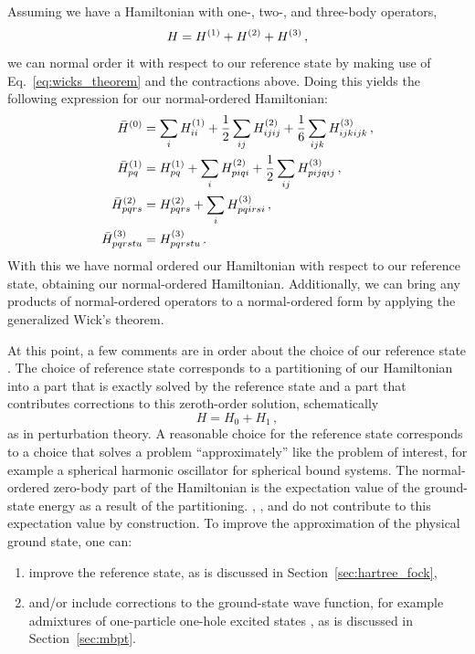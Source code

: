 Assuming we have a Hamiltonian with one-, two-, and three-body operators,
\begin{equation}\label{eq:standard_threebody_free_hamiltonian}
  H = {H}^{(1)} + {H}^{(2)} + {H}^{(3)}\,,
\end{equation}
we can normal order it with respect to our reference state
by making use of Eq.~\ref{eq:wicks_theorem} and the contractions above.
Doing this yields the following expression for our normal-ordered Hamiltonian:
\begin{align}
  {\bar{H}}^{(0)} &= \sum_i {H}^{(1)}_{ii} + \frac{1}{2}\sum_{ij} {H}^{(2)}_{ijij} + \frac{1}{6} \sum_{ijk} {H}^{(3)}_{ijkijk}\,, \\
  {\bar{H}}^{(1)}_{pq} &= {H}^{(1)}_{pq} + \sum_i {H}^{(2)}_{piqi} + \frac{1}{2} \sum_{ij} {H}^{(3)}_{pijqij} \,, \\
  {\bar{H}}^{(2)}_{pqrs} &= {H}^{(2)}_{pqrs} + \sum_i {H}^{(3)}_{pqirsi} \,,  \\
  {\bar{H}}^{(3)}_{pqrstu} &= {H}^{(3)}_{pqrstu} \,.
\end{align}
With this we have normal ordered our Hamiltonian with respect to our reference state,
obtaining our normal-ordered Hamiltonian.
Additionally, we can bring any products of normal-ordered operators to a normal-ordered form
by applying the generalized Wick's theorem.

At this point, a few comments are in order about the choice of our reference state .
The choice of reference state corresponds to a partitioning of our Hamiltonian
into a part that is exactly solved by the reference state
and a part that contributes corrections to this zeroth-order solution,
schematically
\begin{equation}
  H = H_0 + H_1\,,
\end{equation}
as in perturbation theory.
A reasonable choice for the reference state corresponds to a choice
that solves a problem ``approximately'' like the problem of interest,
for example a spherical harmonic oscillator for spherical bound systems.
The normal-ordered zero-body part of the Hamiltonian \hnozero{}
is the expectation value of the ground-state energy as a result of the partitioning.
\hnoone, \hnotwo, and \hnothree{} do not contribute to this expectation value by construction.
To improve the approximation of the physical ground state,
one can:
\begin{enumerate}
  \item improve the reference state, as is discussed in Section~\ref{sec:hartree_fock},
  \item and/or include corrections to the ground-state wave function,
    for example admixtures of one-particle one-hole excited states ,
    as is discussed in Section~\ref{sec:mbpt}.
\end{enumerate}

